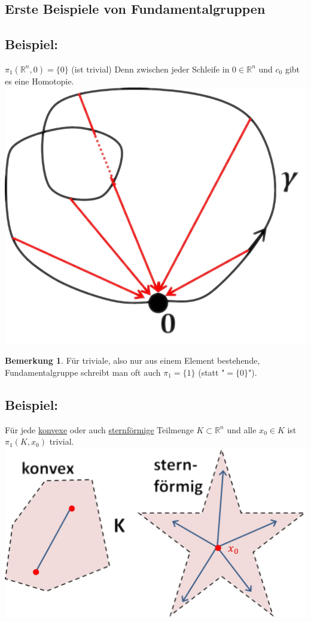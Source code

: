 \documentclass[a4paper,11pt,notitlepage]{report}
\theoremstyle{definition}
\newtheorem{remark}{Bemerkung}[chapter]
\newcommand{\R}{{\ensuremath{\mathbb{R}}}}
\newenvironment{bsp}[1]
{
\setlength{\fboxsep}{10pt}
\subsection*{Beispiel: #1}
\begin{upshape}
}
{
\end{upshape}
}
\begin{document}
\subsection{Erste Beispiele von Fundamentalgruppen}
\begin{bsp}{}
	$\pi_1(\R^n, 0) = \{0\}$ (ist trivial)
	\newline
	Denn zwischen jeder Schleife in $0 \in \R^n$ und $c_0$ gibt es eine Homotopie.
	\newline \includegraphics[scale=0.4]{images/Fundamentalgruppe_Rn.png}
\end{bsp}

\begin{remark}{}
	Für triviale, also nur aus einem Element bestehende, Fundamentalgruppe schreibt man oft auch $\pi_1 = \{1\}$ (statt "$=\{0\}$").
\end{remark}

\begin{bsp}{}
	Für jede \underline{konvexe} oder auch \underline{sternförmige} Teilmenge $K \subset \R^n$ und alle $x_0 \in K$ ist $\pi_1(K,x_0)$ trivial. \newline \includegraphics[scale=0.4]{images/konvex_sternfoermig.png}
\end{bsp}
\end{document}
